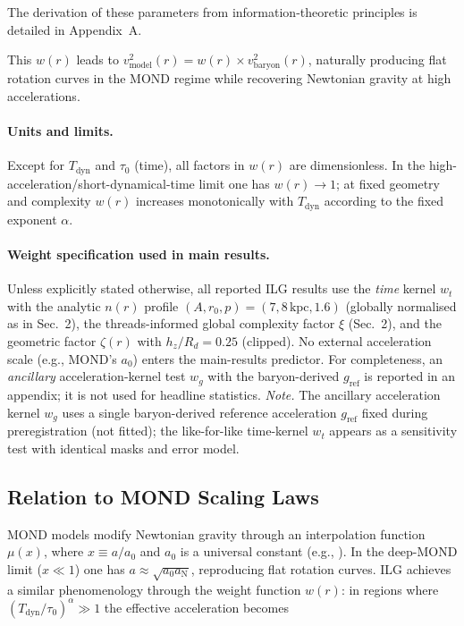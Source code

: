 \documentclass[usenatbib]{mnras}
\begin{document}
The derivation of these parameters from information-theoretic principles is detailed in Appendix~A.

This $w(r)$ leads to $v^2_\mathrm{model}(r) = w(r) \times v^2_\mathrm{baryon}(r)$, naturally producing flat rotation curves in the MOND regime while recovering Newtonian gravity at high accelerations.

\paragraph{Units and limits.} Except for $T_\mathrm{dyn}$ and $\tau_0$ (time), all factors in $w(r)$ are dimensionless. In the high-acceleration/short-dynamical-time limit one has $w(r)\to 1$; at fixed geometry and complexity $w(r)$ increases monotonically with $T_\mathrm{dyn}$ according to the fixed exponent $\alpha$.

\paragraph{Weight specification used in main results.} Unless explicitly stated otherwise, all reported ILG results use the \emph{time} kernel $w_t$ with the analytic $n(r)$ profile $(A,r_0,p)=(7,8\,\mathrm{kpc},1.6)$ (globally normalised as in Sec.~2), the threads-informed global complexity factor $\xi$ (Sec.~2), and the geometric factor $\zeta(r)$ with $h_z/R_d=0.25$ (clipped). No external acceleration scale (e.g., MOND's $a_0$) enters the main-results predictor. For completeness, an \emph{ancillary} acceleration-kernel test $w_g$ with the baryon-derived $g_\mathrm{ref}$ is reported in an appendix; it is not used for headline statistics.
\noindent\textit{Note.} The ancillary acceleration kernel $w_g$ uses a single baryon-derived reference acceleration $g_\mathrm{ref}$ fixed during preregistration (not fitted); the like-for-like time-kernel $w_t$ appears as a sensitivity test with identical masks and error model.

\subsection{Relation to MOND Scaling Laws}

MOND models modify Newtonian gravity through an interpolation function $\mu(x)$, where $x \equiv a/a_0$ and $a_0$ is a universal constant (e.g., \citealp{milgrom1983,famaey2012}). In the deep-MOND limit ($x \ll 1$) one has $a \approx \sqrt{a_0 a_\mathrm{N}}$, reproducing flat rotation curves.  ILG achieves a similar phenomenology through the weight function $w(r)$: in regions where $(T_\mathrm{dyn}/\tau_0)^\alpha \gg 1$ the effective acceleration becomes
\end{document}
